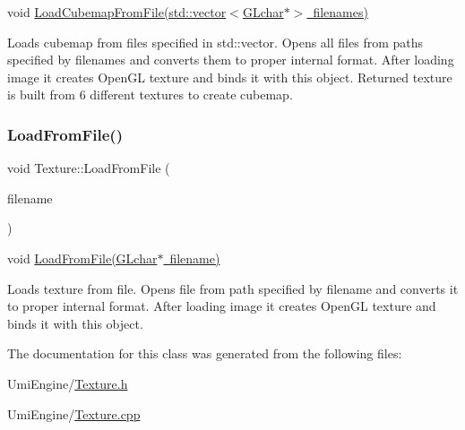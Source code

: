 void \mbox{\hyperlink{class_texture_a056053b6bb3b6ed3bb44a624f0fb62c7}{Load\+Cubemap\+From\+File(std\+::vector$<$\+G\+Lchar$\ast$$>$ filenames)}} 

Loads cubemap from files specified in std\+::vector. Opens all files from paths specified by filenames and converts them to proper internal format. After loading image it creates Open\+GL texture and binds it with this object. Returned texture is built from 6 different textures to create cubemap. \mbox{\label{class_texture_a26134f37b4a22ff895686533937ba218}} 
\subsubsection{\texorpdfstring{LoadFromFile()}{LoadFromFile()}}
{\footnotesize\ttfamily void Texture\+::\+Load\+From\+File (\begin{DoxyParamCaption}\item[{G\+Lchar $\ast$}]{filename }\end{DoxyParamCaption})}



void \mbox{\hyperlink{class_texture_a26134f37b4a22ff895686533937ba218}{Load\+From\+File(\+G\+Lchar$\ast$ filename)}} 

Loads texture from file. Opens file from path specified by filename and converts it to proper internal format. After loading image it creates Open\+GL texture and binds it with this object. 

The documentation for this class was generated from the following files\+:\begin{DoxyCompactItemize}
\item 
Umi\+Engine/\mbox{\hyperlink{_texture_8h}{Texture.\+h}}\item 
Umi\+Engine/\mbox{\hyperlink{_texture_8cpp}{Texture.\+cpp}}\end{DoxyCompactItemize}

